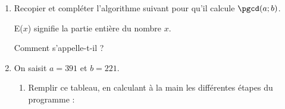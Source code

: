 \begin{TP}

\begin{enumerate}
\item Recopier et compléter l'algorithme suivant pour qu'il calcule $\pgcd(a;b)$.
 
E($x$) signifie la partie entière du nombre $x$.
 
Comment s'appelle-t-il ?

\vspace{-.5\baselineskip}

\begin{center}
  \begin{minipage}{.60\linewidth}
    \begin{algorithme}
      \BlocVariables {} \BlocEntrees {}
      \vspace{3pt}
       \BlocTraitements
       \BlocAffichage \AfficherVar{\dots}%
    \end{algorithme}
  \end{minipage}
\end{center}

\vspace{-.5\baselineskip}

\item On saisit $a=391$ et $b=221$.
\begin{enumerate}
\item Remplir ce tableau, en calculant à la main les différentes
étapes du programme :


\end{enumerate}
\end{enumerate}
\end{TP}
